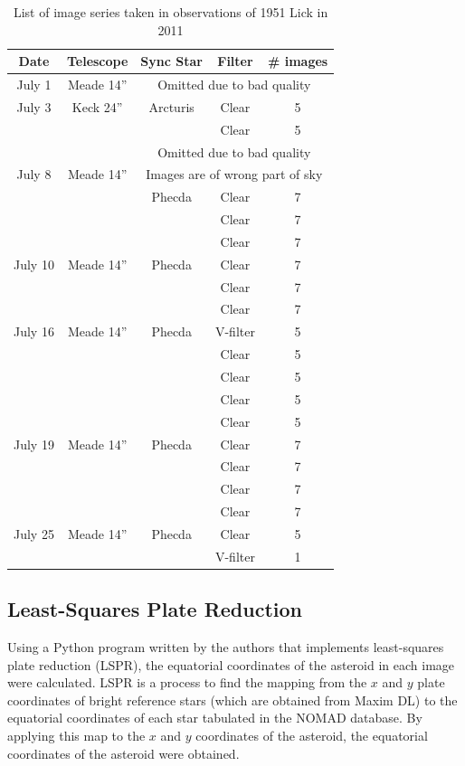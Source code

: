 \documentclass[12pt,journal,compsoc]{IEEEtran}
\begin{document}
\begin{table}[!t]
\centering
\begin{tabular}{|c|c|c|c|c|}
\hline
Date & Telescope & Sync Star & Filter & \# images \\ \hline \hline
July 1 &Meade 14''& \multicolumn{3}{c|}{Omitted due to bad quality}\\ \hline \hline
July 3 & Keck 24''& Arcturis & Clear & 5 \\ \cline{4-5}
 & & & Clear & 5\\ \cline{3-5}
 & & \multicolumn{3}{c|}{Omitted due to bad quality} \\ \hline \hline
July 8 & Meade 14'' &\multicolumn{3}{c|}{Images are of wrong part of sky} \\ \cline{3-5}
 & & Phecda & Clear & 7 \\ \cline{4-5}
 & & & Clear & 7\\ \cline{4-5}
 & & & Clear & 7\\ \hline \hline
July 10 & Meade 14''& Phecda & Clear &7 \\ \cline{4-5}
 & & & Clear & 7\\ \cline{4-5}
 & & & Clear & 7\\ \hline \hline
July 16 & Meade 14''& Phecda & V-filter &5 \\ \cline{4-5}
 & & & Clear & 5\\ \cline{4-5}
 & & & Clear & 5\\ \cline{4-5}
 & & & Clear & 5\\ \cline{4-5}
 & & & Clear & 5\\ \hline \hline
July 19 & Meade 14''& Phecda & Clear &7 \\ \cline{4-5}
 & & & Clear & 7\\ \cline{4-5}
 & & & Clear & 7\\ \cline{4-5}
 & & & Clear & 7\\ \hline \hline
July 25 & Meade 14'' & Phecda & Clear &5 \\ \cline{4-5}
 & & & V-filter & 1\\ \hline
\end{tabular}
\caption{List of image series taken in observations of 1951 Lick in 2011\label{tab:serieslist}}
\end{table}

\subsection{Least-Squares Plate Reduction}
Using a Python program written by the authors that implements least-squares plate reduction (LSPR), 
the equatorial coordinates of the asteroid in each image were calculated.
LSPR is a process to find the mapping from the $x$ and $y$ plate coordinates of bright reference stars 
(which are obtained from Maxim DL) to the equatorial coordinates
of each star tabulated in the NOMAD database.
By applying this map to the $x$ and $y$ coordinates of the asteroid, the equatorial coordinates of
the asteroid were obtained.
\end{document}
